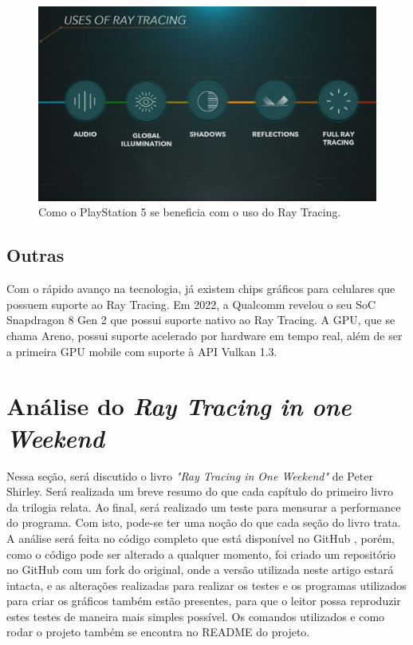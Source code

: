 \documentclass[journal]{IEEEtran}
\begin{document}
\begin{figure}[ht]
  \centering
  \includegraphics[width=\linewidth]{media/ps5_ray.jpg}
  \caption{Como o PlayStation 5 se beneficia com o uso do Ray Tracing.}
  \label{img_ps5_ray}
\end{figure}

\subsection{Outras}
Com o rápido avanço na tecnologia, já existem chips gráficos para celulares que possuem suporte
ao Ray Tracing. Em 2022, a Qualcomm revelou o seu SoC Snapdragon 8 Gen 2 que possui suporte
nativo ao Ray Tracing. A GPU, que se chama Areno, possui suporte acelerado por hardware em
tempo real, além de ser a primeira GPU mobile com suporte à API Vulkan 1.3.


\section{Análise do \emph{Ray Tracing in one Weekend}}
Nessa seção, será discutido o livro \emph{"Ray Tracing in One Weekend"} de Peter Shirley. 
\cite{Shirley2020RTW1} Será realizada um breve resumo do que cada capítulo do primeiro
livro da trilogia relata. Ao final, será realizado um teste para mensurar a performance
do programa. Com isto, pode-se ter uma noção do que cada seção do livro trata. A análise 
será feita no código completo que está disponível no GitHub \cite{RayTracinOneWeekend-GitHub}, 
porém, como o código pode ser alterado a qualquer momento, foi criado um repositório no GitHub 
\cite{RayTracinOneWeekend-Artigo} com um fork
do original, onde a versão utilizada neste artigo estará intacta, e as alterações
realizadas para realizar os testes e os programas utilizados para criar os gráficos
também estão presentes, para que o leitor possa reproduzir estes testes de maneira
mais simples possível. Os comandos utilizados e como rodar o projeto também se 
encontra no README do projeto.
\end{document}
